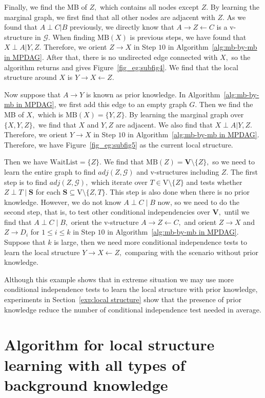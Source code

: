 \documentclass{article}
\begin{document}
Finally, we find the MB of $Z,$ which contains all nodes except $Z.$ By learning the marginal graph, we first find that all other nodes are adjacent with $Z.$ As we found that $A\perp C|B$ previously, we directly know that $A\to Z\leftarrow C$ is a v-structure in $\mathcal{G}.$ When finding $\mathrm{MB}(X)$ is previous steps, we have found that $X\perp A|Y,Z.$ Therefore, we orient $Z\to X$ in Step $10$ in Algorithm~\ref{alg:mb-by-mb in MPDAG}. After that, there is no undirected edge connected with $X,$ so the algorithm returns and gives Figure~\ref{fig_eg:subfig4}. We find that the local structure around $X$ is $Y\to X\leftarrow Z.$

Now suppose that $A\to Y$ is known as prior knowledge. In Algorithm~\ref{alg:mb-by-mb in MPDAG}, we first add this edge to an empty graph $G.$ Then we find the MB of $X,$ which is $\mathrm{MB}(X)=\{Y,Z\}.$ By learning the marginal graph over $\{X,Y,Z\},$ we find that $X$ and $Y,Z$ are adjacent. We also find that $X\perp A|Y,Z.$ Therefore, we orient $Y\to X$ in Step $10$ in Algorithm~\ref{alg:mb-by-mb in MPDAG}. Therefore, we have Figure~\ref{fig_eg:subfig5} as the current local structure.

Then we have $\mathrm{WaitList}=\{Z\}.$ We find that $\mathrm{MB}(Z)=\mathbf{V}\setminus \{Z\},$ so we need to learn the entire graph to find $adj(Z,\mathcal{G})$ and v-structures including $Z.$ The first step is to find $adj(Z,\mathcal{G}),$ which iterate over $T\in \mathrm{V}\setminus \{Z\}$ and tests whether $Z\perp T\mid \mathbf{S}$ for each $\mathbf{S}\subseteq \mathrm{V}\setminus \{Z,T\}.$ This step is also done when there is no prior knowledge. However, we do not know $A\perp C\mid B$ now, so we need to do the second step, that is, to test other conditional independencies over $\mathbf{V},$ until we find that $A\perp C\mid B,$ orient the v-structure $A\to Z\leftarrow C,$ and orient $Z\to X$ and $Z\to D_i$ for $1\le i\le k$ in Step $10$ in Algorithm~\ref{alg:mb-by-mb in MPDAG}. Suppose that $k$ is large, then we need more conditional independence tests to learn the local structure $Y\to X\leftarrow Z,$ comparing with the scenario without prior knowledge.

Although this example shows that in extreme situation we may use more conditional independence tests to learn the local structure with prior knowledge, experiments in Section~\ref{exp:local structure} show that the presence of prior knowledge reduce the number of conditional independence test needed in average.

\section{Algorithm for local structure learning with all types of background knowledge}
\label{append:algorithm}
\end{document}
